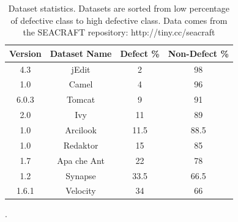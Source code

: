 \documentclass[10pt,conference]{IEEEtran}
\theoremstyle{break}
\theoremstyle{break}
\begin{document}
 \begin{table}[!t]
\begin{center}
\begin{tabular}{|c|c|c|c|}
\hline 
\textbf{Version} & \textbf{Dataset Name} &  \textbf{Defect \%} & \textbf{Non-Defect \%}\\[0.5ex]
\hline
4.3 & jEdit & 2 & 98 \\
\hline
1.0 &   Camel & 4 & 96 \\ 
\hline
6.0.3 &   Tomcat & 9 & 91 \\
\hline
2.0 &   Ivy & 11 & 89 \\ 
\hline
1.0 & Arcilook & 11.5 & 88.5\\
\hline
1.0 & Redaktor & 15 & 85 \\
\hline
1.7 & Apa che Ant & 22 & 78 \\ 
\hline
1.2 &   Synapse & 33.5 & 66.5 \\
\hline
1.6.1 &   Velocity & 34 & 66 \\
\hline
\end{tabular}
\end{center}
\caption{Dataset statistics. Datasets are sorted from low percentage of defective class to high defective class.
Data comes from the SEACRAFT repository: http://tiny.cc/seacraft}.
\label{tb:dataset}
\vspace{-0.6cm}
\end{table}


\newcommand\fnote[1]{\captionsetup{font=small}\caption*{#1}}
\end{document}
